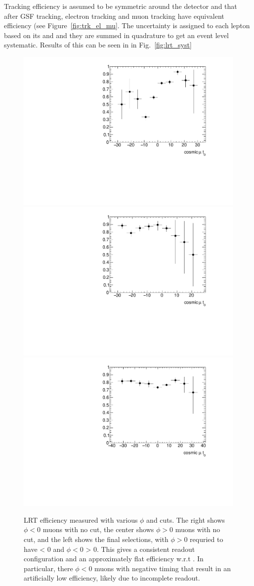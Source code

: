 Tracking efficiency is assumed to be symmetric around the detector and that after GSF tracking, electron tracking and muon tracking have equivalent efficiency (see Figure~\ref{fig:trk_el_mu}. The uncertainty is assigned to each lepton based on its \pt and \absdz and they are summed in quadrature to get an event level systematic. Results of this can be seen in in Fig.~\ref{fig:lrt_syst}




\begin{figure}[htbp]
\centering
\includegraphics[width=.3\textwidth]{figures/LRT_systs/cosmics_phil0_eff_t0.pdf}
\includegraphics[width=.3\textwidth]{figures/LRT_systs/cosmics_phig0_eff_t0.pdf}
\includegraphics[width=.3\textwidth]{figures/LRT_systs/cosmics_eff_t0.pdf}
\caption{\ac{LRT} efficiency measured with various $\phi$ and \tavg cuts. The right shows $\phi < 0$ muons with no \tavg cut, the center shows $\phi > 0$ muons with no \tavg cut, and the left shows the final selections, with $\phi > 0$ requried to have \tavg < 0 and $\phi < 0$ \tavg > 0. This gives a consistent readout configuration and an approximately flat efficiency w.r.t \tavg. In particular, there $\phi < 0$ muons with negative timing that result in an artificially low efficiency, likely due to incomplete readout.}
\label{fig:cos_sys_t0}
\end{figure}


